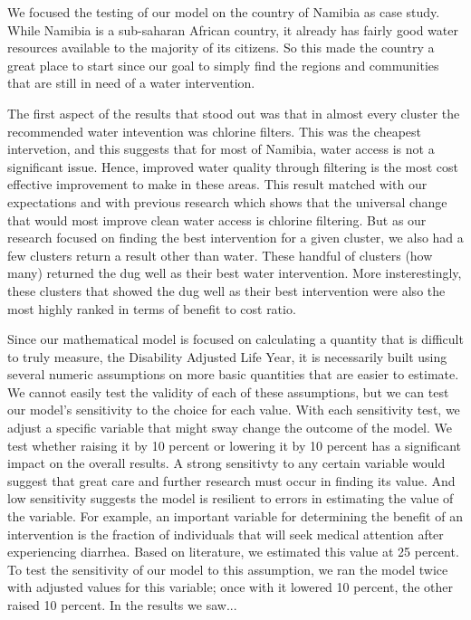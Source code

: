 We focused the testing of our model on the country of Namibia as case study.
While Namibia is a sub-saharan African country, it already has fairly good water resources available to the majority of its citizens.
So this made the country a great place to start since our goal to simply find the regions and communities that are still in need of a water intervention.  

The first aspect of the results that stood out was that in almost every cluster the recommended water intevention was chlorine filters.
This was the cheapest intervetion, and this suggests that for most of Namibia, water access is not a significant issue.
Hence, improved water quality through filtering is the most cost effective improvement to make in these areas.
This result matched with our expectations and with previous research which shows that the universal change that would most improve clean water access is chlorine filtering.
But as our research focused on finding the best intervention for a given cluster, we also had a few clusters return a result other than water.
These handful of clusters (how many) returned the dug well as their best water intervention.
More insterestingly, these clusters that showed the dug well as their best intervention were also the most highly ranked in terms of benefit to cost ratio.  

Since our mathematical model is focused on calculating a quantity that is difficult to truly measure, the Disability Adjusted Life Year, it is necessarily built using several numeric assumptions on more basic quantities that are easier to estimate.
We cannot easily test the validity of each of these assumptions, but we can test our model's sensitivity to the choice for each value.
With each sensitivity test, we adjust a specific variable that might sway change the outcome of the model.
We test whether raising it by 10 percent or lowering it by 10 percent has a significant impact on the overall results.
A strong sensitivty to any certain variable would suggest that great care and further research must occur in finding its value.
And low sensitivity suggests the model is resilient to errors in estimating the value of the variable.
For example, an important variable for determining the benefit of an intervention is the fraction of individuals that will seek medical attention after experiencing diarrhea.
Based on literature, we estimated this value at 25 percent.
To test the sensitivity of our model to this assumption, we ran the model twice with adjusted values for this variable; once with it lowered 10 percent, the other raised 10 percent.
In the results we saw...  

